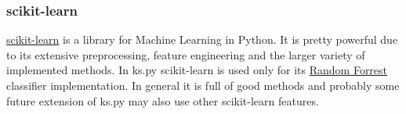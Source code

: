         
        \subsubsection{scikit-learn}
            \href{https://scikit-learn.org/stable/}{scikit-learn} is a library for Machine Learning in Python. It is pretty powerful
            due to its extensive preprocessing, feature engineering and the larger variety of implemented methods. In ks.py scikit-learn is 
            used only for its \href{https://scikit-learn.org/stable/modules/generated/sklearn.ensemble.RandomForestClassifier.html}{Random Forrest}
            classifier implementation. In general it is full of good methods and probably some future extension of ks.py may also use other scikit-learn
            features. 

            


